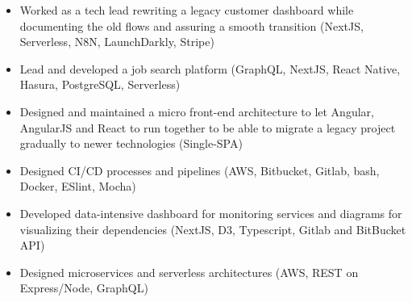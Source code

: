 \documentclass[10pt,a4paper,ragged2e,withhyper]{altacv}
\newcommand\faSkype{{\FA\symbol{"F17E}}}
\begin{document}

\begin{fullwidth}
\makecvheader
\end{fullwidth}



\begin{itemize}
\item Worked as a tech lead rewriting a legacy customer dashboard while documenting the old flows and assuring a smooth transition (NextJS, Serverless, N8N, LaunchDarkly, Stripe)
\item Lead and developed a job search platform (GraphQL, NextJS, React Native, Hasura, PostgreSQL, Serverless)
\item Designed and maintained a micro front-end architecture to let Angular, AngularJS and React to run together to be able to migrate a legacy  project gradually to newer technologies (Single-SPA)
\item Designed CI/CD processes and pipelines (AWS, Bitbucket, Gitlab, bash, Docker, ESlint, Mocha)
\item Developed data-intensive dashboard for monitoring services and diagrams for visualizing their dependencies (NextJS, D3, Typescript, Gitlab and BitBucket API)
\item Designed microservices and serverless architectures (AWS, REST on Express/Node, GraphQL)
\end{itemize}
\end{document}
